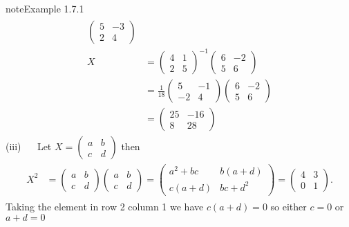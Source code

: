 \documentclass[letterpaper,10pt,english]{jupyterBook}
\begin{document}
\begin{sphinxadmonition}{note}{Example 1.7.1}
\begin{equation*}
\begin{split}
\begin{align*}
    \begin{pmatrix} 5 & -3 \\ 2 & 4 \end{pmatrix} \\
    X &=
    \begin{pmatrix} 4 & 1 \\ 2 & 5 \end{pmatrix}^{-1}
    \begin{pmatrix} 6 & -2 \\ 5 & 6 \end{pmatrix} \\
    &=
    \frac{1}{18} \begin{pmatrix} 5 & -1 \\ -2 & 4 \end{pmatrix}
    \begin{pmatrix} 6 & -2 \\ 5 & 6 \end{pmatrix} \\
    &= \begin{pmatrix} 25 & -16 \\ 8 & 28 \end{pmatrix}
\end{align*} \end{split}
\end{equation*}
\sphinxAtStartPar
(iii)   Let \(X = \begin{pmatrix} a & b \\ c & d \end{pmatrix}\) then
\begin{equation*}
\begin{split} \begin{align*}
    X^2 &=
    \begin{pmatrix} a & b \\ c & d \end{pmatrix}
    \begin{pmatrix} a & b \\ c & d \end{pmatrix}
    =
    \begin{pmatrix} a^2 + bc & b(a + d) \\ c(a + d) & bc + d^2 \end{pmatrix}
    =
    \begin{pmatrix} 4 & 3 \\ 0 & 1 \end{pmatrix}.
\end{align*} \end{split}
\end{equation*}
\sphinxAtStartPar
Taking the element in row 2 column 1 we have \(c(a+d)=0\) so either \(c=0\) or \(a + d = 0\)


\end{sphinxadmonition}
\end{document}
